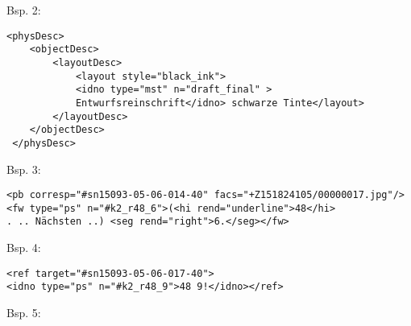 \documentclass{article}
\begin{document}
        Bsp. 2:\\
            
        \begin{verbatim}<physDesc>
    <objectDesc>
        <layoutDesc>
            <layout style="black_ink">
            <idno type="mst" n="draft_final" >
            Entwurfsreinschrift</idno> schwarze Tinte</layout>
        </layoutDesc>
    </objectDesc>
 </physDesc>\end{verbatim}Bsp. 3:\\
            
        \begin{verbatim}<pb corresp="#sn15093-05-06-014-40" facs="+Z151824105/00000017.jpg"/>
<fw type="ps" n="#k2_r48_6">(<hi rend="underline">48</hi>
. .. Nächsten ..) <seg rend="right">6.</seg></fw>\end{verbatim}Bsp. 4:\\
            
        \begin{verbatim}<ref target="#sn15093-05-06-017-40">
<idno type="ps" n="#k2_r48_9">48 9!</idno></ref>\end{verbatim}Bsp. 5:\\
            
\end{document}
